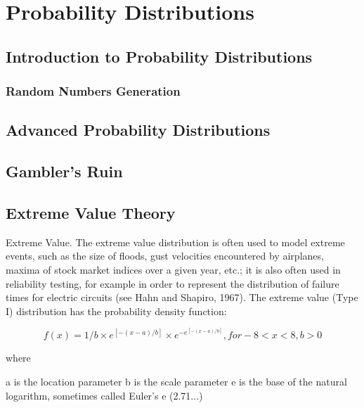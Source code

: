 
\section{Probability Distributions }


\subsection{Introduction to Probability Distributions}

\subsubsection{Random Numbers Generation}

\subsection{Advanced Probability Distributions}

\subsection{Gambler's Ruin}

\subsection{Extreme Value Theory}

Extreme Value. The extreme value distribution is often used to model extreme events, such as the size of floods, gust velocities encountered by airplanes, maxima of stock market indices over a given year, etc.; it is also often used in reliability testing, for example in order to represent the distribution of failure times for electric circuits (see Hahn and Shapiro, 1967). The extreme value (Type I) distribution has the probability density function:

\[f(x) = 1/b \times e^{[-(x-a)/b]} \times e^{-e^{[-(x-a)/b]}},    for -8 < x < 8, b > 0\]

where

a	is the location parameter
b	is the scale parameter
e	is the base of the natural logarithm, sometimes called Euler's e (2.71...)

